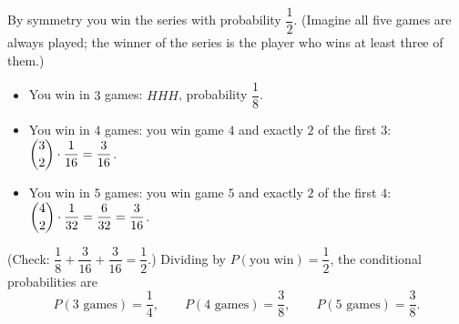 By symmetry you win the series with probability $\dfrac{1}{2}$. (Imagine all five games are always played; the winner of the series is the player who wins at least three of them.)
\begin{itemize}
\item You win in $3$ games: $HHH$, probability $\dfrac{1}{8}$.
\item You win in $4$ games: you win game $4$ and exactly $2$ of the first $3$: $\dbinom32\cdot\dfrac{1}{16}=\dfrac{3}{16}$.
\item You win in $5$ games: you win game $5$ and exactly $2$ of the first $4$: $\dbinom42\cdot\dfrac{1}{32}=\dfrac{6}{32}=\dfrac{3}{16}$.
\end{itemize}
(Check: $\dfrac{1}{8}+\dfrac{3}{16}+\dfrac{3}{16}=\dfrac{1}{2}$.) Dividing by $P(\text{you win})=\dfrac{1}{2}$, the conditional probabilities are
\[
P(3\text{ games})=\boxed{\dfrac{1}{4}},\qquad P(4\text{ games})=\boxed{\dfrac{3}{8}},\qquad P(5\text{ games})=\boxed{\dfrac{3}{8}}.
\]
